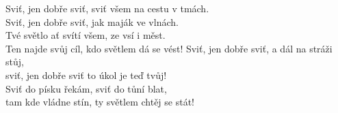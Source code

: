 \ve{}
Sviť, jen dobře sviť, sviť všem na cestu v tmách.\\               
Sviť, jen dobře sviť, jak maják ve vlnách.\\
Tvé světlo ať svítí všem, ze vsí i měst. \\
Ten najde svůj cíl, kdo světlem dá se vést!
\ve{}
Sviť, jen dobře sviť, a dál na stráži stůj,\\
sviť, jen dobře sviť  to úkol je teď tvůj!\\
Sviť do písku řekám, sviť do tůní blat, \\
tam kde vládne stín, ty světlem chtěj se stát!
\esong{}